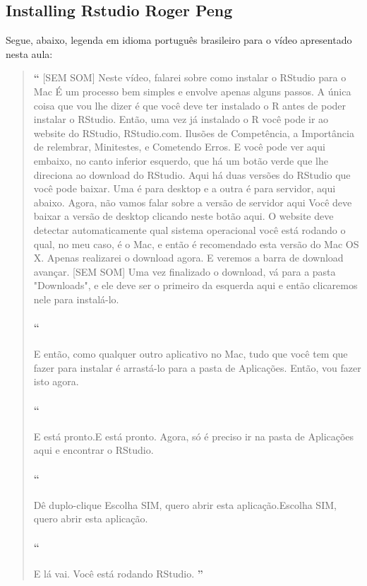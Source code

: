\subsection{Installing Rstudio {Roger Peng}}

Segue, abaixo, legenda em idioma português brasileiro para o vídeo apresentado nesta aula:

\begin{quotation}%
\begin{small}
{\large\textbf{``}}%
[SEM SOM] Neste vídeo, falarei sobre como instalar o RStudio para o Mac É um processo bem simples e envolve apenas alguns passos. A única coisa que vou lhe dizer é que você deve ter instalado o R antes de poder instalar o RStudio. Então, uma vez já instalado o R você pode ir ao website do RStudio, RStudio.com. Ilusões de Competência, a Importância de relembrar, Minitestes, e Cometendo Erros. E você pode ver aqui embaixo, no canto inferior esquerdo, que há um botão verde que lhe direciona ao download do RStudio. Aqui há duas versões do RStudio que você pode baixar. Uma é para desktop e a outra é para servidor, aqui abaixo. Agora, não vamos falar sobre a versão de servidor aqui Você deve baixar a versão de desktop clicando neste botão aqui. O website deve detectar automaticamente qual sistema operacional você está rodando o qual, no meu caso, é o Mac, e então é recomendado esta versão do Mac OS X. Apenas realizarei o download agora. E veremos a barra de download avançar. [SEM SOM] Uma vez finalizado o download, vá para a pasta "Downloads", e ele deve ser o primeiro da esquerda aqui e então clicaremos nele para instalá-lo.

\paragraph{``}
E então, como qualquer outro aplicativo no Mac, tudo que você tem que fazer para instalar é arrastá-lo para a pasta de Aplicações. Então, vou fazer isto agora.

\paragraph{``}
E está pronto.E está pronto. Agora, só é preciso ir na pasta de Aplicações aqui e encontrar o RStudio.

\paragraph{``}
Dê duplo-clique Escolha SIM, quero abrir esta aplicação.Escolha SIM, quero abrir esta aplicação.

\paragraph{``}
E lá vai. Você está rodando RStudio.
{\large\textbf{''}}
\end{small}
\end{quotation}


